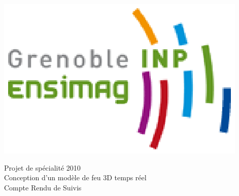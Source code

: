 \documentclass[a4paper,10pt]{article}
\begin{document}


\begin{center}
	\hspace{8cm}
	\includegraphics[scale=0.8]{logo.ps}

	\vspace{3cm}
	{\huge Projet de spécialité 2010}\\
	{\huge Conception d'un modèle de feu 3D temps réel}\\
	{\large Compte Rendu de Suivis}\\
	\vspace{1cm}



\end{center}
\end{document}
